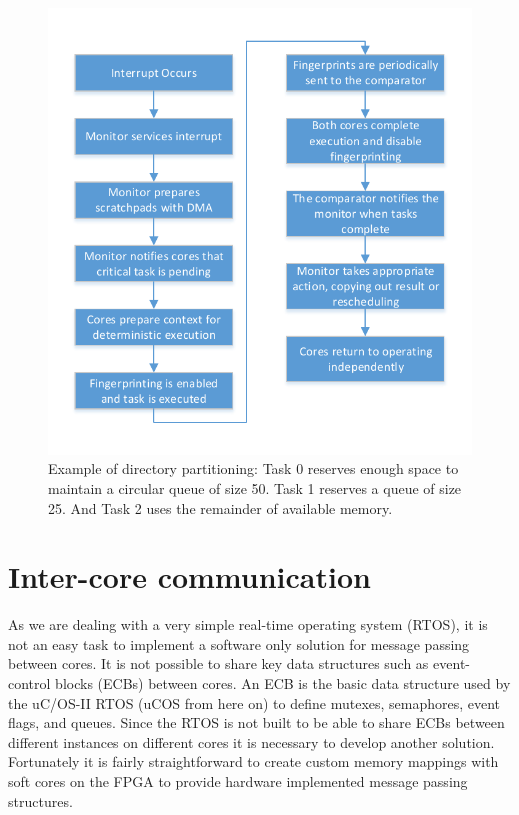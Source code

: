 \begin{figure}
\centering
\includegraphics[scale=0.8]{Figures/control_flow}
\caption[Example of directory partitioning]{Example of directory partitioning: Task 0 reserves enough space to maintain a circular queue of size 50. Task 1 reserves a queue of size 25. And Task 2 uses the remainder of available memory.}
\label{f:control_flow}
\end{figure}


\section{Inter-core communication}

As we are dealing with a very simple real-time operating system (RTOS), it is not an easy task to implement a software only solution for message passing between cores. It is not possible to share key data structures such as event-control blocks (ECBs) between cores. An ECB is the basic data structure used by the uC/OS-II RTOS (uCOS from here on) to define mutexes, semaphores, event flags, and queues. Since the RTOS is not built to be able to share ECBs between different instances on different cores it is necessary to develop another solution. Fortunately it is fairly straightforward to create custom memory mappings with soft cores on the FPGA to provide hardware implemented message passing structures.


